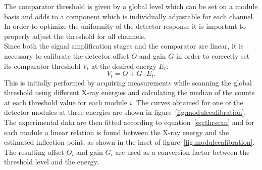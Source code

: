 The comparator threshold is given by a global level which can be set on a module basis and adds to a component which is individually adjustable for each channel. In order to optimize the uniformity of the detector response it is important to properly adjust the threshold for all channels. \\
Since both the signal amplification stages and the comparator  are linear, it is necessary to calibrate the detector offset $O$ and gain $G$ in order to correctly set its comparator threshold $V_t$ at the desired energy $E_t$:
\begin{equation}
V_{t}=O+G \cdot E_t.\label{eq:encal}
\end{equation}
This is initially performed by acquiring measurements while scanning the global threshold using different X-ray energies and calculating the median of the counts at each threshold value for each module $i$. The curves obtained for one of the detector modules at three energies are shown in figure~\ref{fig:modulecalibration}. The experimental data are then fitted according to equation~\ref{eq:thrscan} and for each module a linear relation is found between the X-ray energy and the estimated inflection point, as shown in the inset of figure~\ref{fig:modulecalibration}. The resulting offset  $O_i$ and  gain $G_i$ are used as a conversion factor between the threshold level and the energy. 



